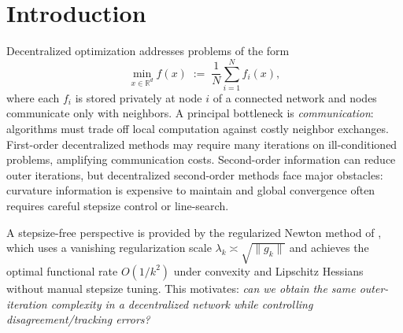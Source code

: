 \documentclass[11pt,a4paper]{article}
\def\cO{O}%
\newcommand{\R}{\mathbb{R}}
\newcommand{\cO}{\mathcal{O}}
\begin{document}
	\section{Introduction}
	Decentralized optimization addresses problems of the form
	\begin{equation}\label{eq:intro_prob}
		\min_{x\in\R^d} f(x)\;:=\;\frac{1}{N}\sum_{i=1}^N f_i(x),
	\end{equation}
	where each $f_i$ is stored privately at node $i$ of a connected network and nodes communicate only with neighbors.
	A principal bottleneck is \emph{communication}: algorithms must trade off local computation
	against costly neighbor exchanges.
	First-order decentralized methods may require many iterations on ill-conditioned problems, amplifying communication costs.
	Second-order information can reduce outer iterations, but decentralized second-order methods face major obstacles:
	curvature information is expensive to maintain and global convergence often requires careful stepsize control or line-search.
	
	A stepsize-free perspective is provided by the regularized Newton method of \citet{mishchenko2023rn},
	which uses a vanishing regularization scale $\lambda_k\asymp \sqrt{\|g_k\|}$ and achieves the optimal functional rate $\cO(1/k^2)$
	under convexity and Lipschitz Hessians without manual stepsize tuning.
	This motivates: \emph{can we obtain the same outer-iteration complexity in a decentralized network while controlling disagreement/tracking errors?}
	
\end{document}
